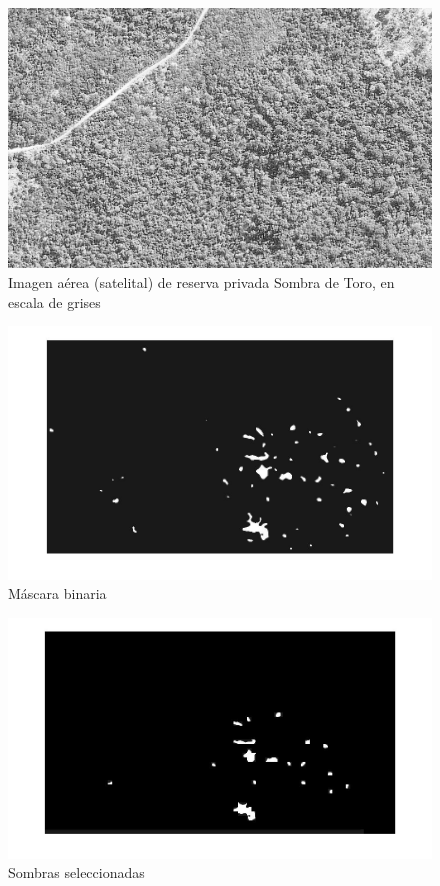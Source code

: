 

\begin{figure}[h!]
    \includegraphics[width=\textwidth]{Imagenes/Homomorfico/ST2.jpg}
     \hfill
     \caption{Imagen aérea (satelital) de reserva privada Sombra de Toro, en escala de grises}
    \label{sombratorogris}
\end{figure}

\begin{figure}[h!]
    \includegraphics[width=\textwidth]{Imagenes/Homomorfico/ST2_bin.jpg}
     \hfill
     \caption{Máscara binaria}
    \label{mascaraST}
\end{figure}

\begin{figure}[h!]
    \includegraphics[width=\textwidth]{Imagenes/Homomorfico/ST2_masked.jpg}
     \hfill
     \caption{Sombras seleccionadas}
    \label{seleccionadaST}
\end{figure}
